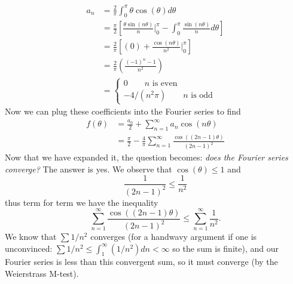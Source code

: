 \begin{ex}
\begin{subequations}
\begin{align}
a_{n} &=
\frac{2}{\pi}\int^{\pi}_{0}\theta\cos(\theta)d\theta \\
&=\frac{\pi}{2}\left[\frac{\theta\sin(n\theta)}{n}\Big|^{\pi}_{0}-\int^{\pi}_{0}\frac{\sin(n\theta)}{n}d\theta\right]\\
&=\frac{2}{\pi}\left[\left(0\right)+\frac{\cos(n\theta)}{n^2}\Big|^{\pi}_{0}\right] \\
&= \frac{2}{\pi}\left(\frac{(-1)^{n}-1}{n^{2}}\right) \\
&= \begin{cases} 0\qquad \text{$n$ is even} \\
-4/(n^2\pi)\qquad\text{$n$ is odd} 
\end{cases}
\end{align}
\end{subequations}
Now we can plug these coefficients into the Fourier series
to find
\begin{subequations}\label{eq:2April2008:fourierSeriesAbsoluteTheta}
\begin{align}
f(\theta) &= \frac{a_0}{2} +
\sum^{\infty}_{n=1}a_{n}\cos(n\theta) \\
&= \frac{\pi}{2} - \frac{4}{\pi}\sum^{\infty}_{n=1}\frac{\cos((2n-1)\theta)}{(2n-1)^2}
\end{align}
\end{subequations}
Now that we have expanded it, the question becomes:
\emph{does the Fourier series converge?} The answer is
yes. We observe that $\cos(\theta)\leq 1$ and 
\begin{equation}
\frac{1}{(2n-1)^2}\leq\frac{1}{n^2}
\end{equation}
thus term for term we have the inequality
\begin{equation}
\sum^{\infty}_{n=1}\frac{\cos((2n-1)\theta)}{(2n-1)^2} \leq \sum^{\infty}_{n=1}\frac{1}{n^2}.
\end{equation}
We know that $\sum 1/n^2$ converges (for a handwavy argument
if one is unconvinced: $\sum 1/n^2 \leq \int^{\infty}_{1}
(1/n^2)dn <\infty$ so the sum is finite), and our Fourier
series is less than this convergent sum, so it must converge
(by the Weierstrass M-test). 



\end{ex}
